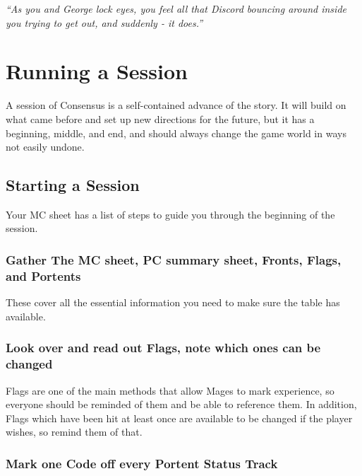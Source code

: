 \documentclass[
  oneside,
  statementpaper,
  9pt]{memoir}
\begin{document}
\emph{``As you and George lock eyes, you feel all that Discord bouncing
around inside you trying to get out, and suddenly - it does.''}

\hypertarget{running-a-session}{%
\section{Running a Session}\label{running-a-session}}

A session of Consensus is a self-contained advance of the story. It will
build on what came before and set up new directions for the future, but
it has a beginning, middle, and end, and should always change the game
world in ways not easily undone.

\hypertarget{starting-a-session}{%
\subsection{Starting a Session}\label{starting-a-session}}

Your MC sheet has a list of steps to guide you through the beginning of
the session.

\hypertarget{gather-the-mc-sheet-pc-summary-sheet-fronts-flags-and-portents}{%
\subsubsection{Gather The MC sheet, PC summary sheet, Fronts, Flags, and
Portents}\label{gather-the-mc-sheet-pc-summary-sheet-fronts-flags-and-portents}}

These cover all the essential information you need to make sure the
table has available.

\hypertarget{look-over-and-read-out-flags-note-which-ones-can-be-changed}{%
\subsubsection{Look over and read out Flags, note which ones can be
changed}\label{look-over-and-read-out-flags-note-which-ones-can-be-changed}}

Flags are one of the main methods that allow Mages to mark experience,
so everyone should be reminded of them and be able to reference them. In
addition, Flags which have been hit at least once are available to be
changed if the player wishes, so remind them of that.

\hypertarget{mark-one-code-off-every-portent-status-track}{%
\subsubsection{Mark one Code off every Portent Status
Track}\label{mark-one-code-off-every-portent-status-track}}
\end{document}
